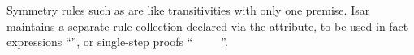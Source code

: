 \begin{isabellebody}
\begin{isamarkuptext}
  \medskip Symmetry rules such as  are like
  transitivities with only one premise.  Isar maintains a separate
  rule collection declared via the \hyperlink{attribute.sym}{\mbox{}} attribute, to be
  used in fact expressions ``'', or single-step
  proofs ``\hyperlink{command.assume}{\mbox{}}~~\hyperlink{command.then}{\mbox{}}~\hyperlink{command.have}{\mbox{}}~~\hyperlink{command.ddot}{\mbox{}}''.%
\end{isamarkuptext}%
\isamarkuptrue%
%
\isadelimtheory
%
\endisadelimtheory
%
\isatagtheory
{}\isamarkupfalse%
%
\endisatagtheory
{\isafoldtheory}%
%
\isadelimtheory
%
\endisadelimtheory
\end{isabellebody}%
